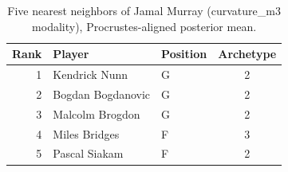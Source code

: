 \begin{table}[htbp]
  \centering\small
  \begin{tabular}{rllc}
    \toprule
    Rank & Player & Position & Archetype \\
    \midrule
    1 & Kendrick Nunn & G & 2 \\
    2 & Bogdan Bogdanovic & G & 2 \\
    3 & Malcolm Brogdon & G & 2 \\
    4 & Miles Bridges & F & 3 \\
    5 & Pascal Siakam & F & 2 \\
    \bottomrule
  \end{tabular}
  \caption{Five nearest neighbors of Jamal Murray (curvature_m3 modality), Procrustes-aligned posterior mean.}
  \label{tab:Jamal_Murray_neighbors_curvature_m3}
\end{table}

